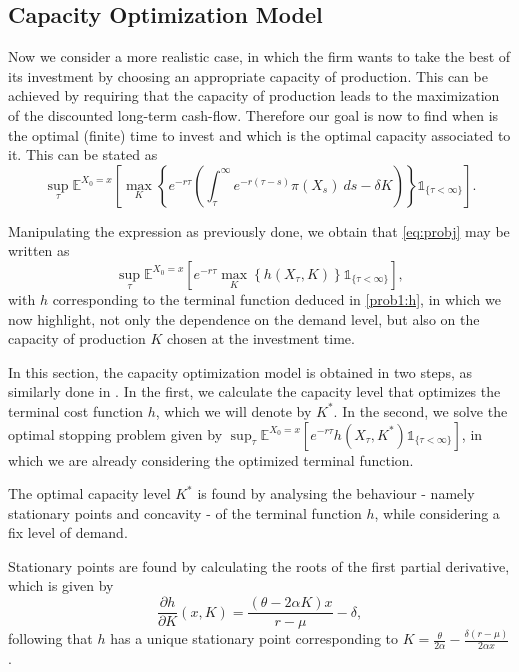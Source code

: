 

\subsection{Capacity Optimization Model}
\label{subsec:1_com}

Now we consider a more realistic case, in which the firm wants to take the best of its investment by choosing an appropriate capacity of production. This can be achieved by requiring that the capacity of production leads to the maximization of the discounted long-term cash-flow. Therefore our goal is now to find when is the optimal (finite) time to invest and which is the optimal capacity associated to it. This can be stated as
\begin{equation}
\sup_\tau \mathds{E}^{X_0=x} \left[ \max_K \left\{ e^{-r\tau }  \left( \int_\tau^\infty e^{-r(\tau-s)} \pi(X_s)\ ds -\delta K \right) \right\} \mathds{1}_{\{\tau<\infty\}} \right].
\label{eq:probj}
\end{equation}

Manipulating the expression as previously done, we obtain that \eqref{eq:probj} may be written as
\begin{equation}
\sup_\tau \mathds{E}^{X_0=x} \left[ e^{-r\tau } \max_K \left\{ h(X_\tau,K) \right\} \mathds{1}_{\{\tau<\infty\}} \right],
\label{eq:q1}
\end{equation}
with $h$ corresponding to the terminal function deduced in \eqref{prob1:h}, in which we now highlight, not only the dependence on the demand level, but also on the capacity of production $K$ chosen at the investment time.

In this section, the capacity optimization model is obtained in two steps, as similarly done in \cite{huis:cap}. In the first, we calculate the capacity level that optimizes the terminal cost function $h$, which we will denote by $K^*$. In the second, we solve the optimal stopping problem given by $\sup_\tau \mathds{E}^{X_0=x}\left[e^{-r\tau}h(X_\tau,K^*) \mathds{1}_{\{\tau<\infty\}} \right]$, in which we are already considering the optimized terminal function.

The optimal capacity level $K^*$ is found by analysing the behaviour - namely stationary points and concavity  - of the terminal function $h$, while considering a fix level of demand.

Stationary points are found by calculating the roots of the first partial derivative, which is given by
\begin{equation}
\frac{\partial h }{\partial K}(x,K)=  \frac{(\theta-2\alpha K)x}{r-\mu} - \delta,
\label{1_dK}
\end{equation}
following  that $h$ has a unique stationary point corresponding to
$K=\frac{\theta}{2\alpha}-\frac{\delta (r-\mu)}{2 \alpha x}$.


